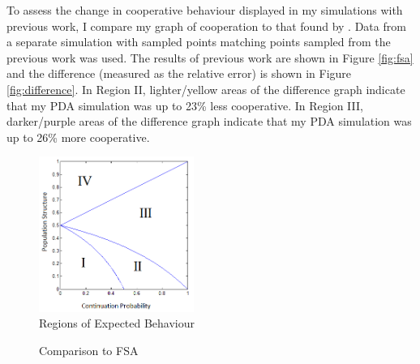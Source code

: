 \documentclass[a4paper,11pt,bcshonoursthesis,singlespace,oneside,thesisdraft,pdflatex]{cssethesis}
\begin{document}
To assess the change in cooperative behaviour displayed in my simulations with previous work, I compare my graph of cooperation to that found by \citet{van-veelen:PNAS:2012}. 
Data from a separate simulation with sampled points matching points sampled from the previous work was used. 
The results of previous work  are shown in Figure \ref{fig:fsa} and the difference (measured as the relative error) is shown in Figure \ref{fig:difference}. 
In Region II, lighter/yellow areas of the difference graph indicate that my PDA simulation was up to 23\% less cooperative. 
In Region III, darker/purple areas of the difference graph indicate that my PDA simulation was up to 26\% more cooperative. 

\begin{figure}[h]
\center
\includegraphics[width=0.45\textwidth]{regions}
\caption{Regions of Expected Behaviour}
\label{fig:regions2}
\end{figure}

\begin{figure}[h]
\caption{Comparison to FSA}
\label{fig:comparison}
\end{figure}
\end{document}
